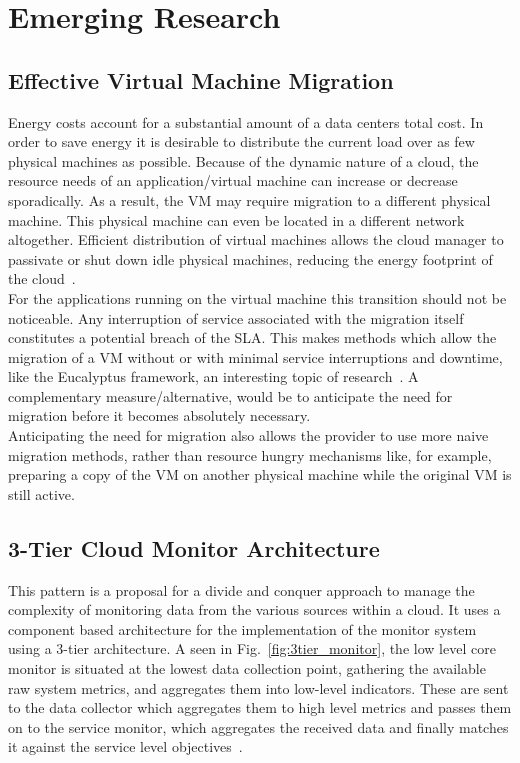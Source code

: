\documentclass[a4paper]{llncs}
\begin{document}
\section{Emerging Research}

\subsection{Effective Virtual Machine Migration}

Energy costs account for a substantial amount of a data centers total cost. In order to save energy it is desirable to distribute the current load over as few physical machines as possible. Because of the dynamic nature of a cloud, the resource needs of an application/virtual machine can increase or decrease sporadically. As a result, the VM may require migration to a different physical machine. This physical machine can even be located in a different network altogether. Efficient distribution of virtual machines allows the cloud manager to passivate or shut down idle physical machines, reducing the energy footprint of the cloud~\cite{Graubner}.\\

For the applications running on the virtual machine this transition should not be noticeable. Any interruption of service associated with the migration itself constitutes a potential breach of the SLA. This makes methods which allow the migration of a VM without or with minimal service interruptions and downtime, like the Eucalyptus framework, an interesting topic of research~\cite{Zhao09}. A complementary measure/alternative, would be to anticipate the need for migration before it becomes absolutely necessary.\\
Anticipating the need for migration also allows the provider to use more naive migration methods, rather than resource hungry mechanisms like, for example, preparing a copy of the VM on another physical machine while the original VM is still active.

\subsection{3-Tier Cloud Monitor Architecture}
This pattern is a proposal for a divide and conquer approach to manage the complexity of monitoring data from the various sources within a cloud. It uses a component based architecture for the implementation of the monitor system using a 3-tier architecture.
A seen in Fig.~\ref{fig:3tier_monitor}, the low level core monitor is situated at the lowest data collection point, gathering the available raw system metrics, and aggregates them into low-level indicators. These are sent to the data collector  which aggregates them to high level metrics and passes them on to the service monitor, which aggregates the received data and finally matches it against the service level objectives~\cite{Chazalet10}.\\
\end{document}
